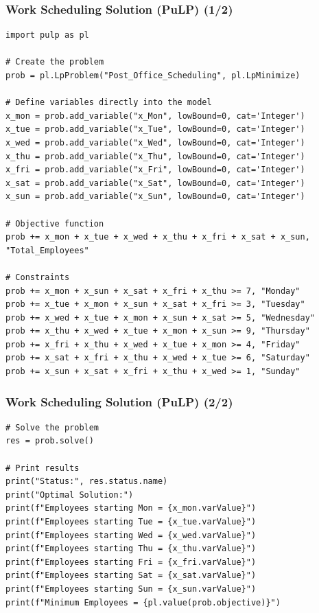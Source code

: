 \documentclass{beamer}
\begin{document}
\begin{frame}
\frametitle{Work Scheduling Solution (PuLP) (1/2)}
\begin{lstlisting}
import pulp as pl

# Create the problem
prob = pl.LpProblem("Post_Office_Scheduling", pl.LpMinimize)

# Define variables directly into the model
x_mon = prob.add_variable("x_Mon", lowBound=0, cat='Integer')
x_tue = prob.add_variable("x_Tue", lowBound=0, cat='Integer')
x_wed = prob.add_variable("x_Wed", lowBound=0, cat='Integer')
x_thu = prob.add_variable("x_Thu", lowBound=0, cat='Integer')
x_fri = prob.add_variable("x_Fri", lowBound=0, cat='Integer')
x_sat = prob.add_variable("x_Sat", lowBound=0, cat='Integer')
x_sun = prob.add_variable("x_Sun", lowBound=0, cat='Integer')

# Objective function
prob += x_mon + x_tue + x_wed + x_thu + x_fri + x_sat + x_sun, "Total_Employees"

# Constraints
prob += x_mon + x_sun + x_sat + x_fri + x_thu >= 7, "Monday"
prob += x_tue + x_mon + x_sun + x_sat + x_fri >= 3, "Tuesday"
prob += x_wed + x_tue + x_mon + x_sun + x_sat >= 5, "Wednesday"
prob += x_thu + x_wed + x_tue + x_mon + x_sun >= 9, "Thursday"
prob += x_fri + x_thu + x_wed + x_tue + x_mon >= 4, "Friday"
prob += x_sat + x_fri + x_thu + x_wed + x_tue >= 6, "Saturday"
prob += x_sun + x_sat + x_fri + x_thu + x_wed >= 1, "Sunday"

\end{lstlisting}
\end{frame}

\begin{frame}
\frametitle{Work Scheduling Solution (PuLP) (2/2)}
\begin{lstlisting}
# Solve the problem
res = prob.solve()

# Print results
print("Status:", res.status.name)
print("Optimal Solution:")
print(f"Employees starting Mon = {x_mon.varValue}")
print(f"Employees starting Tue = {x_tue.varValue}")
print(f"Employees starting Wed = {x_wed.varValue}")
print(f"Employees starting Thu = {x_thu.varValue}")
print(f"Employees starting Fri = {x_fri.varValue}")
print(f"Employees starting Sat = {x_sat.varValue}")
print(f"Employees starting Sun = {x_sun.varValue}")
print(f"Minimum Employees = {pl.value(prob.objective)}")
\end{lstlisting}
\end{frame}
\end{document}
